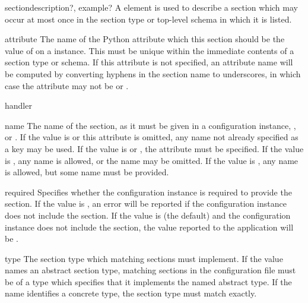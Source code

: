 \documentclass{howto}
\newcommand{\datatype}[1]{\strong{#1}}
\begin{document}
\begin{elementdesc}{section}{description?, example?}
  A  element is used to describe a section which may
  occur at most once in the section type or top-level schema in which
  it is listed.

  \begin{attributedesc}{attribute}{\datatype{identifier}}
    The name of the Python attribute which this section should be the
    value of on a  instance.  This must be unique
    within the immediate contents of a section type or schema.  If
    this attribute is not specified, an attribute name will be
    computed by converting hyphens in the section name to underscores,
    in which case the  attribute may not be \code{*}
    or \code{+}.
  \end{attributedesc}

  \begin{attributedesc}{handler}{\datatype{basic-key}}
  \end{attributedesc}

  \begin{attributedesc}{name}{\datatype{basic-key}}
    The name of the section, as it must be given in a configuration
    instance, \code{*}, or \code{+}.  If the value is \code{*} or this
    attribute is omitted, any name not already specified as a key may
    be used.  If the value is \code{*} or \code{+}, the
     attribute must be specified.  If the value
    is \code{*}, any name is allowed, or the name may be omitted.  If
    the value is \code{+}, any name is allowed, but some name must be
    provided.
  \end{attributedesc}

  \begin{attributedesc}{required}{}
    Specifies whether the configuration instance is required to
    provide the section.  If the value is , an error will be
    reported if the configuration instance does not include the
    section.  If the value is  (the default) and the
    configuration instance does not include the section, the value
    reported to the application will be .
  \end{attributedesc}

  \begin{attributedesc}{type}{\datatype{basic-key}}
    The section type which matching sections must implement.  If the
    value names an abstract section type, matching sections in the
    configuration file must be of a type which specifies that it
    implements the named abstract type.  If the name identifies a
    concrete type, the section type must match exactly.
  \end{attributedesc}
\end{elementdesc}
\end{document}
